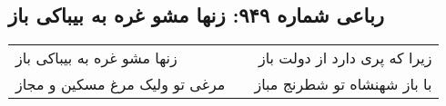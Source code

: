\begin{center}
\section*{رباعی شماره ۹۴۹: زنها مشو غره به بیباکی باز}
\label{sec:0949}
\begin{longtable}{l p{0.5cm} r}
زنها مشو غره به بیباکی باز
&&
زیرا که پری دارد از دولت باز
\\
مرغی تو ولیک مرغ مسکین و مجاز
&&
با باز شهنشاه تو شطرنج مباز
\\
\end{longtable}
\end{center}
